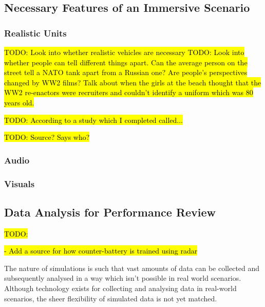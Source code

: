 \documentclass{article}
\begin{document}
\subsection{Necessary Features of an Immersive Scenario}

\subsubsection{Realistic Units}

\hl{TODO: Look into whether realistic vehicles are necessary
TODO: Look into whether people can tell different things apart. Can the average person on the street tell a NATO tank apart from a Russian one? Are people's perspectives changed by WW2 films? Talk about when the girls at the beach thought that the WW2 re-enactors were recruiters and couldn't identify a uniform which was 80 years old.}

\hl{TODO: According to a study which I completed called... }

\hl{TODO: Source? Says who?}

\subsubsection{Audio}



\subsubsection{Visuals}


\subsection{Data Analysis for Performance Review}

\hl{TODO:} 

\hl{- Add a source for how counter-battery is trained using radar}

The nature of simulations is such that vast amounts of data can be collected and subsequently analysed in a way which isn't possible in real world scenarios. Although technology exists for collecting and analysing data in real-world scenarios, the sheer flexibility of simulated data is not yet matched.
\end{document}

